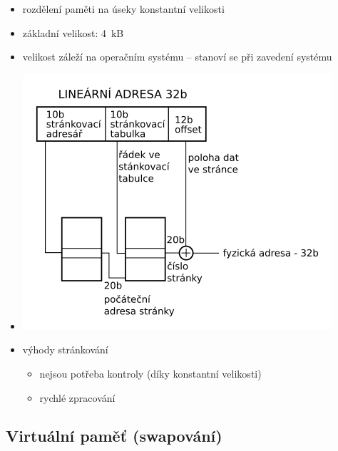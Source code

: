\documentclass[a4paper,12pt]{article}
\providecommand{\tightlist}{%
\setlength{\itemsep}{0pt}\setlength{\parskip}{0pt}}
\begin{document}
\begin{itemize}
\tightlist
\item rozdělení paměti na úseky konstantní velikosti
\item základní velikost: 4~kB
\item velikost záleží na operačním systému -- stanoví se při zavedení
  systému
\item[] \includegraphics[width=11.455cm]{ref/strankovani-fyzicka-adresa.png}
\item výhody stránkování
  \begin{itemize}
    \tightlist
    \item nejsou potřeba kontroly (díky konstantní velikosti)
    \item rychlé zpracování
  \end{itemize}
\end{itemize}

\subsection{Virtuální paměť (swapování)}
\end{document}
